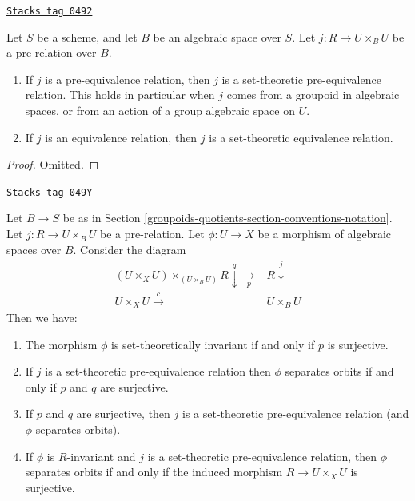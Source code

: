 \begin{lemma}
\label{groupoids-quotients-lemma-set-theoretic-equivalence}
\href{https://stacks.math.columbia.edu/tag/0492}{\texttt{Stacks tag 0492}}

Let $S$ be a scheme, and let $B$ be an algebraic space over $S$.
Let $j : R \to U \times_B U$ be a pre-relation over $B$.
\begin{enumerate}
\item If $j$ is a pre-equivalence relation, then $j$ is a
set-theoretic pre-equivalence relation. This holds in particular
when $j$ comes from a groupoid in algebraic spaces, or from an
action of a group algebraic space on $U$.
\item If $j$ is an equivalence relation, then $j$ is a
set-theoretic equivalence relation.
\end{enumerate}
\end{lemma}

\begin{proof}
Omitted.
\end{proof}

\begin{lemma}
\label{groupoids-quotients-lemma-separates-orbits}
\href{https://stacks.math.columbia.edu/tag/049Y}{\texttt{Stacks tag 049Y}}

Let $B \to S$ be as in Section \ref{groupoids-quotients-section-conventions-notation}.
Let $j : R \to U \times_B U$ be a pre-relation.
Let $\phi : U \to X$ be a morphism of algebraic spaces over $B$.
Consider the diagram
$$
\begin{array}{cc}(U \times_X U) \times_{(U \times_B U)} R \overset{q}{\downarrow}\underset{p}{\longrightarrow} & R \overset{j}{\downarrow} \\ U \times_X U \overset{c}{\longrightarrow} & U \times_B U\end{array}
$$
Then we have:
\begin{enumerate}
\item The morphism $\phi$ is set-theoretically invariant if and only
if $p$ is surjective.
\item If $j$ is a set-theoretic pre-equivalence relation then
$\phi$ separates orbits if and only if $p$ and $q$ are surjective.
\item If $p$ and $q$ are surjective, then $j$ is a set-theoretic
pre-equivalence relation (and $\phi$ separates orbits).
\item If $\phi$ is $R$-invariant and $j$ is a set-theoretic pre-equivalence
relation, then $\phi$ separates orbits if and only if the induced morphism
$R \to U \times_X U$ is surjective.
\end{enumerate}
\end{lemma}

